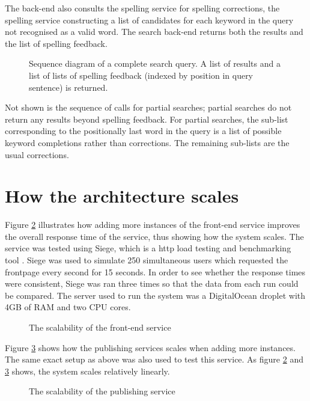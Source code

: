 The back-end also consults the spelling service for spelling corrections, the spelling service constructing a list of candidates for each keyword in the query not recognised as a valid word. 
The search back-end returns both the results and the list of spelling feedback.



\begin{figure}[H]
    \centering
    
    \caption{Sequence diagram of a complete search query. A list of results and a list of lists of spelling feedback (indexed by position in query sentence) is returned.}
    \label{fig:search_arch}
\end{figure}

Not shown is the sequence of calls for partial searches; partial searches do not return any results beyond spelling feedback. For partial searches, the sub-list corresponding to the positionally last word in the query is a list of possible keyword completions rather than corrections. The remaining sub-lists are the usual corrections. 

\section{How the architecture scales}\label{sec:architecture-scalability}
Figure \ref{fig:frontend-scaling} illustrates how adding more instances of the front-end service improves the overall response time of the service, thus showing how the system scales. The service was tested using Siege, which is a \acrshort{http} load testing and benchmarking tool \citep{siege}. Siege was used to simulate 250 simultaneous users which requested the frontpage every second for 15 seconds. In order to see whether the response times were consistent, Siege was ran three times so that the data from each run could be compared.
The server used to run the system was a DigitalOcean droplet with 4GB of RAM and two CPU cores.
\begin{figure}[H]
    \centering
    
    \caption{The scalability of the front-end service}\label{fig:frontend-scaling}
\end{figure}

Figure \ref{fig:publishing-scaling} shows how the publishing services scales when adding more instances. The same exact setup as above was also used to test this service. As figure \ref{fig:frontend-scaling} and \ref{fig:publishing-scaling} shows, the system scales relatively linearly. 
\begin{figure}[H]
    \centering
    
    \caption{The scalability of the publishing service}\label{fig:publishing-scaling}
\end{figure}

